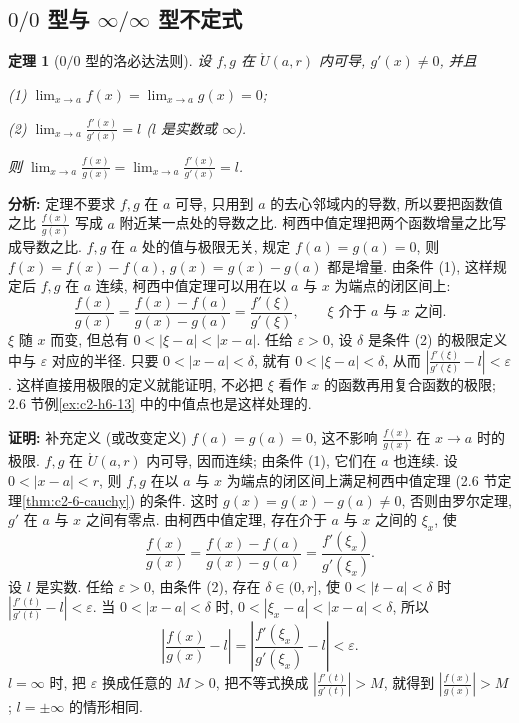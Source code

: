 \documentclass[UTF8,openany]{ctexbook}
\theoremstyle{chinesetextbook}
\newtheorem{theorem}{定理}[section]
\newenvironment{cnproof}{\par\indent\textbf{证明:} \ignorespaces}{\par}
\begin{document}
\subsection{\texorpdfstring{$0/0$ 型与 $\infty/\infty$ 型不定式}{0/0 型与 ∞/∞ 型不定式}}
\begin{theorem}[$0/0$ 型的洛必达法则]\label{thm:c2-7-lh1}
设 $f,g$ 在 $\mathring U(a,r)$ 内可导, $g'(x)\ne0$, 并且

\textup{(1)} $\displaystyle\lim_{x\to a}f(x)=\lim_{x\to a}g(x)=0$;

\textup{(2)} $\displaystyle\lim_{x\to a}\frac{f'(x)}{g'(x)}=l$ ($l$ 是实数或 $\infty$).

则 $\displaystyle\lim_{x\to a}\frac{f(x)}{g(x)}=\lim_{x\to a}\frac{f'(x)}{g'(x)}=l$.
\end{theorem}
\par\indent\textbf{分析:} 定理不要求 $f,g$ 在 $a$ 可导, 只用到 $a$ 的去心邻域内的导数, 所以要把函数值之比 $\displaystyle\frac{f(x)}{g(x)}$ 写成 $a$ 附近某一点处的导数之比. 柯西中值定理把两个函数增量之比写成导数之比. $f,g$ 在 $a$ 处的值与极限无关, 规定 $f(a)=g(a)=0$, 则 $f(x)=f(x)-f(a)$, $g(x)=g(x)-g(a)$ 都是增量. 由条件 (1), 这样规定后 $f,g$ 在 $a$ 连续, 柯西中值定理可以用在以 $a$ 与 $x$ 为端点的闭区间上:
\[
\frac{f(x)}{g(x)}=\frac{f(x)-f(a)}{g(x)-g(a)}=\frac{f'(\xi)}{g'(\xi)},\qquad\xi\text{ 介于 }a\text{ 与 }x\text{ 之间}.
\]
$\xi$ 随 $x$ 而变, 但总有 $0<|\xi-a|<|x-a|$. 任给 $\varepsilon>0$, 设 $\delta$ 是条件 (2) 的极限定义中与 $\varepsilon$ 对应的半径. 只要 $0<|x-a|<\delta$, 就有 $0<|\xi-a|<\delta$, 从而 $\displaystyle\left|\frac{f'(\xi)}{g'(\xi)}-l\right|<\varepsilon$. 这样直接用极限的定义就能证明, 不必把 $\xi$ 看作 $x$ 的函数再用复合函数的极限; 2.6 节例\ref{ex:c2-h6-13} 中的中值点也是这样处理的.
\begin{cnproof}
补充定义 (或改变定义) $f(a)=g(a)=0$, 这不影响 $\displaystyle\frac{f(x)}{g(x)}$ 在 $x\to a$ 时的极限. $f,g$ 在 $\mathring U(a,r)$ 内可导, 因而连续; 由条件 (1), 它们在 $a$ 也连续. 设 $0<|x-a|<r$, 则 $f,g$ 在以 $a$ 与 $x$ 为端点的闭区间上满足柯西中值定理 (2.6 节定理\ref{thm:c2-6-cauchy}) 的条件. 这时 $g(x)=g(x)-g(a)\ne0$, 否则由罗尔定理, $g'$ 在 $a$ 与 $x$ 之间有零点. 由柯西中值定理, 存在介于 $a$ 与 $x$ 之间的 $\xi_x$, 使
\[
\frac{f(x)}{g(x)}=\frac{f(x)-f(a)}{g(x)-g(a)}=\frac{f'(\xi_x)}{g'(\xi_x)}.
\]
设 $l$ 是实数. 任给 $\varepsilon>0$, 由条件 (2), 存在 $\delta\in(0,r]$, 使 $0<|t-a|<\delta$ 时 $\displaystyle\left|\frac{f'(t)}{g'(t)}-l\right|<\varepsilon$. 当 $0<|x-a|<\delta$ 时, $0<|\xi_x-a|<|x-a|<\delta$, 所以
\[
\left|\frac{f(x)}{g(x)}-l\right|=\left|\frac{f'(\xi_x)}{g'(\xi_x)}-l\right|<\varepsilon.
\]
$l=\infty$ 时, 把 $\varepsilon$ 换成任意的 $M>0$, 把不等式换成 $\displaystyle\left|\frac{f'(t)}{g'(t)}\right|>M$, 就得到 $\displaystyle\left|\frac{f(x)}{g(x)}\right|>M$; $l=\pm\infty$ 的情形相同.
\end{cnproof}
\end{document}

